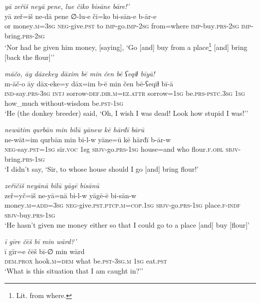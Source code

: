 \ea \label{HB.18}
\textit{yā zeřiš neyā pene, lue čiko bisāne bāre!’} \\ 
\gll yā zeř=iš ne-dā pene ∅-lu-e či=ko bi-sān-e b-ār-e \\ 
 or money\textsc{.m}\textsc{=3sg} \textsc{neg-}give\textsc{.pst} to \textsc{imp-}go.\textsc{imp-}\textsc{2sg} from=where \textsc{imp-}buy\textsc{.prs}-\textsc{2sg} \textsc{imp-}bring\textsc{.prs}-\textsc{2sg} \\ 
\glt `Nor had he given him money, [saying], ‘Go [and] buy from a place\footnote{Lit. from where.} [and] bring [back the flour]’'
\z 
 
\ea \label{HB.19}
\textit{māčo, āy dāxekey dāxim bē min čen bē ʕeqiɫ bīyā!} \\ 
\gll m-āč-o āy dāx-eke=y dāx=im b-ē min čen bē-ʕeqiɫ bī-ā \\ 
 \textsc{ind-}say\textsc{.prs}\textsc{-3sg} \textsc{intj} sorrow\textsc{-def}\textsc{.dir}\textsc{.m}\textsc{=ez}.\textsc{attr} sorrow\textsc{=1sg} be\textsc{.prs}\textsc{-pstc}\textsc{.3sg} \textsc{1sg} how\_much without-wisdom be\textsc{.pst}\textsc{-1sg} \\ 
\glt `He (the donkey breeder) said, ‘Oh, I wish I was dead! Look how stupid I was!’'
\z 
 
\ea \label{HB.20}
\textit{newātim qurbān min bilū yānew kē hārđī bārū} \\ 
\gll ne-wāt=im qurbān min bi-l-w yāne=ū kē hārđī b-ār-w \\ 
 \textsc{neg-}say\textsc{.pst}\textsc{=1sg} sir.\textsc{voc} 1sg \textsc{sbjv-}go\textsc{.prs}\textsc{-1sg} house=and who flour\textsc{\textsc{.f}}\textsc{.obl} \textsc{sbjv-}bring\textsc{.prs}\textsc{-1sg} \\ 
\glt `I didn’t say, ‘Sir, to whose house should I go [and] bring flour!'
\z 
 
\ea \label{HB.22}
\textit{zeřīčiš neyānā bilū yāgē bisānū} \\ 
\gll zeř=yč=iš ne-yā=nā bi-l-w yāgē-ē bi-sān-w \\ 
 money\textsc{.m}\textsc{=add}\textsc{=3sg} \textsc{neg-}give\textsc{.pst}\textsc{.ptcp}\textsc{.m}\textsc{=cop}\textsc{.1sg} \textsc{sbjv-}go\textsc{.prs}\textsc{-1sg} place\textsc{\textsc{.f}}\textsc{-indf} \textsc{sbjv-}buy\textsc{.prs}\textsc{-1sg} \\ 
\glt `He hasn’t given me money either so that I could go to a place [and] buy [flour]'
\z 
 
\ea \label{HB.23}
\textit{ī gīre čēš bī min wārd?’} \\ 
\gll ī gīr=e čēš bī-∅ min wārd \\ 
 \textsc{dem.prox} hook\textsc{.m}\textsc{=dem} what be\textsc{.pst}\textsc{-3sg}\textsc{.m} \textsc{1sg} eat\textsc{.pst} \\ 
\glt `What is this situation that I am caught in?’'
\z 
 
